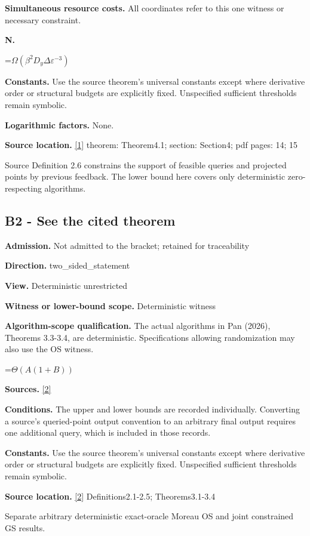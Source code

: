 \documentclass[10pt,a4paper]{article}
\newcommand{\AtlasMath}[1]{\par\begingroup\centering\setbox0=\hbox{$\displaystyle #1$}\ifdim\wd0>1.4\linewidth\typeout{ATLAS WIDE FORMULA: \the\wd0}\fi\ifdim\wd0>\linewidth\resizebox{\linewidth}{!}{\box0}\else\box0\fi\par\endgroup}
\begin{document}
\textbf{Simultaneous resource costs.} All coordinates refer to this one witness or necessary constraint.

\textbf{N.}

\AtlasMath{\Omega(\beta^2D_y\Delta\varepsilon^{-3})}
\textbf{Constants.} Use the source theorem’s universal constants except where derivative order or structural budgets are explicitly fixed. Unspecified sufficient thresholds remain symbolic.

\textbf{Logarithmic factors.} None.

\textbf{Source location.} \href{https://arxiv.org/pdf/2609.14233v1}{[1]} theorem: Theorem4.1; section: Section4; pdf pages: 14; 15

Source Definition 2.6 constrains the support of feasible queries and projected points by previous feedback. The lower bound here covers only deterministic zero-respecting algorithms.

\subsection{B2 - See the cited theorem}
\textbf{Admission.} Not admitted to the bracket; retained for traceability

\textbf{Direction.} two\_sided\_statement

\textbf{View.} Deterministic unrestricted

\textbf{Witness or lower-bound scope.} Deterministic witness

\textbf{Algorithm-scope qualification.} The actual algorithms in Pan (2026), Theorems 3.3-3.4, are deterministic. Specifications allowing randomization may also use the OS witness.

\AtlasMath{\Theta(A(1+B))}
\textbf{Sources.} \href{https://arxiv.org/pdf/2609.14235v2}{[2]}

\textbf{Conditions.} The upper and lower bounds are recorded individually. Converting a source's queried-point output convention to an arbitrary final output requires one additional query, which is included in those records.

\textbf{Constants.} Use the source theorem’s universal constants except where derivative order or structural budgets are explicitly fixed. Unspecified sufficient thresholds remain symbolic.

\textbf{Source location.} \href{https://arxiv.org/pdf/2609.14235v2}{[2]} Definitions2.1-2.5; Theorems3.1-3.4

Separate arbitrary deterministic exact-oracle Moreau OS and joint constrained GS results.
\end{document}
